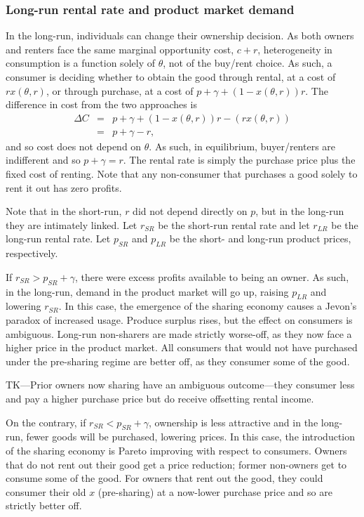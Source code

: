 \documentclass[11pt]{article}
\begin{document}
\subsubsection{Long-run rental rate and product market demand} 
In the long-run, individuals can change their ownership decision. 
As both owners and renters face the same marginal opportunity cost, $c + r$, heterogeneity in consumption is a function solely of $\theta$, not of the buy/rent choice. 
As such, a consumer is deciding whether to obtain the good through rental, at a cost of $rx(\theta, r)$, 
or through purchase, at a cost of $p + \gamma + (1 - x(\theta,r))r$. 
The difference in cost from the two approaches is 
\begin{eqnarray*}
\Delta C &=& p + \gamma + (1 - x(\theta, r))r - \left(rx(\theta, r)\right) \\
         &=& p + \gamma - r, 
\end{eqnarray*} 
and so cost does not depend on $\theta$. 
As such, in equilibrium, buyer/renters are indifferent and so $p + \gamma = r$. 
The rental rate is simply the purchase price plus the fixed cost of renting. 
Note that any non-consumer that purchases a good solely to rent it out has zero profits. 

Note that in the short-run, $r$ did not depend directly on $p$, but in the long-run they are intimately linked. 
Let $r_{SR}$ be the short-run rental rate and let $r_{LR}$ be the long-run rental rate. 
Let $p_{SR}$ and $p_{LR}$ be the short- and long-run product prices, respectively.  

If $r_{SR} > p_{SR} + \gamma$, there were excess profits available to being an owner. 
As such, in the long-run, demand in the product market will go up, raising $p_{LR}$ and lowering $r_{SR}$. 
In this case, the emergence of the sharing economy causes a Jevon's paradox of increased usage. 
Produce surplus rises, but the effect on consumers is ambiguous. 
Long-run non-sharers are made strictly worse-off, as they now face a higher price in the product market. 
All consumers that would not have purchased under the pre-sharing regime are better off, as they consumer some of the good.

TK---Prior owners now sharing have an ambiguous outcome---they consumer less and pay a higher purchase price but do receive offsetting rental income.  

On the contrary, if $r_{SR} < p_{SR} + \gamma$, ownership is less attractive and in the long-run, fewer goods will be purchased, lowering prices. 
In this case, the introduction of the sharing economy is Pareto improving with respect to consumers. 
Owners that do not rent out their good get a price reduction; former non-owners get to consume some of the good. 
For owners that rent out the good, they could consumer their old $x$ (pre-sharing) at a now-lower purchase price and so are strictly better off. 
\end{document}
